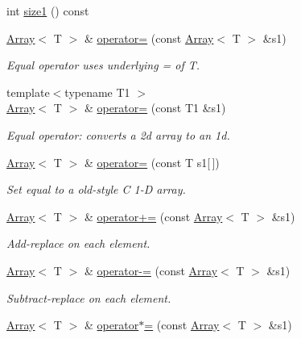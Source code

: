 \begin{DoxyCompactItemize}
int \mbox{\hyperlink{classXMLArray_1_1Array_a33e863988af56d045439d31058088c8c}{size1}} () const
\item 
\mbox{\hyperlink{classXMLArray_1_1Array}{Array}}$<$ T $>$ \& \mbox{\hyperlink{classXMLArray_1_1Array_a99fd481573c47ab9a9e35ed597575b0e}{operator=}} (const \mbox{\hyperlink{classXMLArray_1_1Array}{Array}}$<$ T $>$ \&s1)
\begin{DoxyCompactList}\small\item\em Equal operator uses underlying = of T. \end{DoxyCompactList}\item 
{\footnotesize template$<$typename T1 $>$ }\\\mbox{\hyperlink{classXMLArray_1_1Array}{Array}}$<$ T $>$ \& \mbox{\hyperlink{classXMLArray_1_1Array_a3051ecb95c6d07f9ad80e72a2fd50c61}{operator=}} (const T1 \&s1)
\begin{DoxyCompactList}\small\item\em Equal operator\+: converts a 2d array to an 1d. \end{DoxyCompactList}\item 
\mbox{\hyperlink{classXMLArray_1_1Array}{Array}}$<$ T $>$ \& \mbox{\hyperlink{classXMLArray_1_1Array_a73e85fb91d2c802400fa356bc3ce77e1}{operator=}} (const T s1\mbox{[}$\,$\mbox{]})
\begin{DoxyCompactList}\small\item\em Set equal to a old-\/style C 1-\/D array. \end{DoxyCompactList}\item 
\mbox{\hyperlink{classXMLArray_1_1Array}{Array}}$<$ T $>$ \& \mbox{\hyperlink{classXMLArray_1_1Array_ab8a6046aa7dbc0b3c43e4479b1eaf004}{operator+=}} (const \mbox{\hyperlink{classXMLArray_1_1Array}{Array}}$<$ T $>$ \&s1)
\begin{DoxyCompactList}\small\item\em Add-\/replace on each element. \end{DoxyCompactList}\item 
\mbox{\hyperlink{classXMLArray_1_1Array}{Array}}$<$ T $>$ \& \mbox{\hyperlink{classXMLArray_1_1Array_aa92c6d59ed6a656c3004db85bd67c192}{operator-\/=}} (const \mbox{\hyperlink{classXMLArray_1_1Array}{Array}}$<$ T $>$ \&s1)
\begin{DoxyCompactList}\small\item\em Subtract-\/replace on each element. \end{DoxyCompactList}\item 
\mbox{\hyperlink{classXMLArray_1_1Array}{Array}}$<$ T $>$ \& \mbox{\hyperlink{classXMLArray_1_1Array_a866bd17aae2f3d1935f015a936ce9424}{operator$\ast$=}} (const \mbox{\hyperlink{classXMLArray_1_1Array}{Array}}$<$ T $>$ \&s1)

\end{DoxyCompactItemize}
